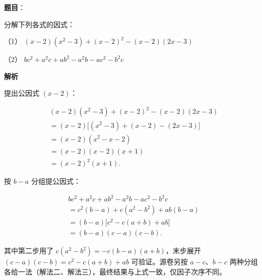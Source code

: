 \begin{answer}

\textbf{题目}：

分解下列各式的因式：

（1） $(x-2)(x^2-3)+(x-2)^2-(x-2)(2x-3)$

（2） $bc^2+a^2c+ab^2-a^2b-ac^2-b^2c$

\textbf{解析}


提出公因式 $(x-2)$：

\nopagebreak[4]
\[
\begin{aligned}
&(x-2)(x^2-3)+(x-2)^2-(x-2)(2x-3)\\
&=(x-2)\bigl[(x^2-3)+(x-2)-(2x-3)\bigr]\\
&=(x-2)(x^2-x-2)\\
&=(x-2)(x-2)(x+1)\\
&=(x-2)^2(x+1).
\end{aligned}
\]


按 $b-a$ 分组提公因式：

\nopagebreak[4]
\[
\begin{aligned}
&bc^2+a^2c+ab^2-a^2b-ac^2-b^2c\\
&=c^2(b-a)+c(a^2-b^2)+ab(b-a)\\
&=(b-a)\bigl[c^2-c(a+b)+ab\bigr]\\
&=(b-a)(c-a)(c-b).
\end{aligned}
\]

其中第二步用了 $c(a^2-b^2)=-c(b-a)(a+b)$，末步展开 $(c-a)(c-b)=c^2-c(a+b)+ab$ 可验证。源卷另按 $a-c$、$b-c$ 两种分组各给一法（解法二、解法三），最终结果与上式一致，仅因子次序不同。



\end{answer}
